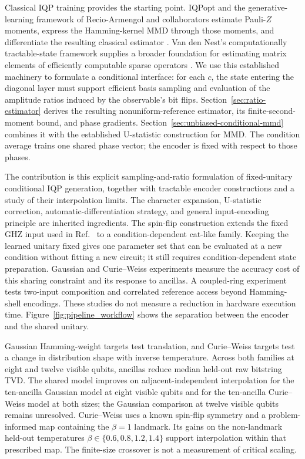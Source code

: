 \documentclass[pra,aps,10pt,twocolumn,floatfix,superscriptaddress,
notitlepage,longbibliography]{revtex4-2}
\begin{document}
Classical IQP training provides the starting point. IQPopt and the generative-learning framework of Recio-Armengol and collaborators estimate Pauli-$Z$ moments, express the Hamming-kernel MMD through those moments, and differentiate the resulting classical estimator \cite{recio-armengolIQPoptFastOptimization2025,recio-armengolTrainClassicalDeploy2026}. Van den Nest's computationally tractable-state framework supplies a broader foundation for estimating matrix elements of efficiently computable sparse operators \cite{nestSimulatingQuantumComputers2011}. We use this established machinery to formulate a conditional interface: for each $c$, the state entering the diagonal layer must support efficient basis sampling and evaluation of the amplitude ratios induced by the observable's bit flips. Section~\ref{sec:ratio-estimator} derives the resulting nonuniform-reference estimator, its finite-second-moment bound, and phase gradients. Section~\ref{sec:unbiased-conditional-mmd} combines it with the established U-statistic construction for MMD. The condition average trains one shared phase vector; the encoder is fixed with respect to those phases.

The contribution is this explicit sampling-and-ratio formulation of fixed-unitary conditional IQP generation, together with tractable encoder constructions and a study of their interpolation limits. The character expansion, U-statistic correction, automatic-differentiation strategy, and general input-encoding principle are inherited ingredients. The spin-flip construction extends the fixed GHZ input used in Ref.~\cite{recio-armengolTrainClassicalDeploy2026} to a condition-dependent cat-like family. Keeping the learned unitary fixed gives one parameter set that can be evaluated at a new condition without fitting a new circuit; it still requires condition-dependent state preparation. Gaussian and Curie--Weiss experiments measure the accuracy cost of this sharing constraint and its response to ancillas. A coupled-ring experiment tests two-input composition and correlated reference access beyond Hamming-shell encodings. These studies do not measure a reduction in hardware execution time. Figure~\ref{fig:pipeline_workflow} shows the separation between the encoder and the shared unitary.

Gaussian Hamming-weight targets test translation, and Curie--Weiss targets test a change in distribution shape with inverse temperature. Across both families at eight and twelve visible qubits, ancillas reduce median held-out raw bitstring TVD. The shared model improves on adjacent-independent interpolation for the ten-ancilla Gaussian model at eight visible qubits and for the ten-ancilla Curie--Weiss model at both sizes; the Gaussian comparison at twelve visible qubits remains unresolved. Curie--Weiss uses a known spin-flip symmetry and a problem-informed map containing the $\beta=1$ landmark. Its gains on the non-landmark held-out temperatures $\beta\in\{0.6,0.8,1.2,1.4\}$ support interpolation within that prescribed map. The finite-size crossover is not a measurement of critical scaling.
\end{document}
